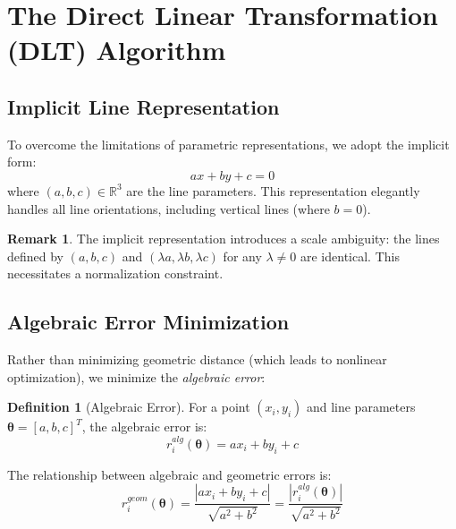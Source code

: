 \documentclass[12pt]{article}
\renewcommand{\vec}[1]{\mathbf{#1}}
\newcommand{\abs}[1]{\left| #1 \right|}
\newcommand{\R}{\mathbb{R}}
\theoremstyle{definition}
\newtheorem{definition}{Definition}[section]
\newtheorem{remark}{Remark}[section]
\begin{document}
\newpage
\section{The Direct Linear Transformation (DLT) Algorithm}

\subsection{Implicit Line Representation}

To overcome the limitations of parametric representations, we adopt the implicit form:
\begin{equation}
    ax + by + c = 0
\end{equation}
where $(a, b, c) \in \R^3$ are the line parameters. This representation elegantly handles all line orientations, including vertical lines (where $b = 0$).

\begin{remark}
    The implicit representation introduces a scale ambiguity: the lines defined by $(a, b, c)$ and $(\lambda a, \lambda b, \lambda c)$ for any $\lambda \neq 0$ are identical. This necessitates a normalization constraint.
\end{remark}

\subsection{Algebraic Error Minimization}

Rather than minimizing geometric distance (which leads to nonlinear optimization), we minimize the \textit{algebraic error}:

\begin{definition}[Algebraic Error]
    For a point $(x_i, y_i)$ and line parameters $\vec{\theta} = [a, b, c]^T$, the algebraic error is:
    \begin{equation}
        r_i^{alg}(\vec{\theta}) = ax_i + by_i + c
    \end{equation}
\end{definition}

The relationship between algebraic and geometric errors is:
\begin{equation}
    r_i^{geom}(\vec{\theta}) = \frac{\abs{ax_i + by_i + c}}{\sqrt{a^2 + b^2}} = \frac{\abs{r_i^{alg}(\vec{\theta})}}{\sqrt{a^2 + b^2}}
\end{equation}
\end{document}
